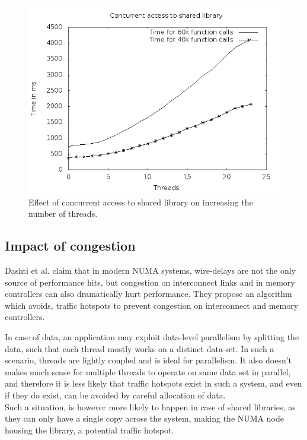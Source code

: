 \begin{figure}
    \centering
    \includegraphics[scale=0.39]{timevsthread_noMem.png}
    \caption{Effect of concurrent access to shared library on increasing the number of threads.}
    \label{fig:timevsthread.png}
\end{figure}

\subsection{Impact of congestion}
Dashti et al. \cite{Dashti:2013:TMH:2490301.2451157} claim that in modern NUMA systems, wire-delays
are not the only source of performance hits, but congestion on interconnect links and in memory 
controllers can also dramatically hurt performance. They propose an algorithm which avoids, traffic
hotspots to prevent congestion on interconnect and memory controllers.

In case of data, an application may exploit data-level parallelism by splitting the data, such that
each thread mostly works on a distinct data-set. In such a scenario, threads are lightly coupled and
is ideal for parallelism. It also doesn't makes much sense for multiple threads to operate on 
same data set in parallel, and therefore it is less likely that traffic hotspots exist in such a system,
and even if they do exist, can be avoided by careful allocation of data.\\
Such a situation, is however more likely to happen in case of shared libraries, as they can only have
a single copy across the system, making the NUMA node housing the library, a potential traffic hotspot.

